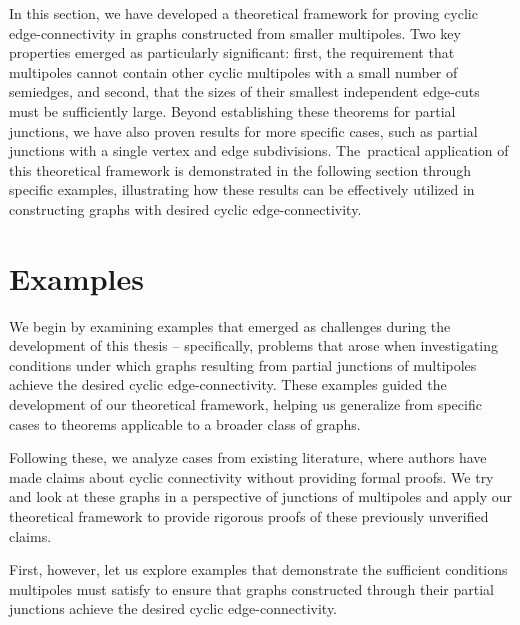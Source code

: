 \documentclass[12pt, twoside]{book}
\begin{document}
In this section, we have developed a theoretical framework for proving cyclic \mbox{edge-connectivity} in graphs constructed from smaller multipoles. Two key properties emerged as particularly significant: first, the requirement that multipoles cannot contain other cyclic multipoles with a small number of semiedges, and second, that the sizes of their smallest independent edge-cuts must be sufficiently large. Beyond establishing these theorems for partial junctions, we have also proven results for more specific cases, such as partial junctions with a single vertex and edge subdivisions. The~practical application of this theoretical framework is demonstrated in the following section through specific examples, illustrating how these results can be effectively utilized in constructing graphs with desired cyclic edge-connectivity.

\section{Examples}\label{sec:examples}

We begin by examining examples that emerged as challenges during the development of this thesis -- specifically, problems that arose when investigating conditions under which graphs resulting from partial junctions of multipoles achieve the desired cyclic edge-connectivity. These examples guided the development of our theoretical framework, helping us generalize from specific cases to theorems applicable to a broader class of graphs.

Following these, we analyze cases from existing literature, where authors have made claims about cyclic connectivity without providing formal proofs. We try and look at these graphs in a perspective of junctions of multipoles and apply our theoretical framework to provide rigorous proofs of these previously unverified claims.

First, however, let us explore examples that demonstrate the sufficient conditions multipoles must satisfy to ensure that graphs constructed through their partial junctions achieve the desired cyclic edge-connectivity.
\end{document}
